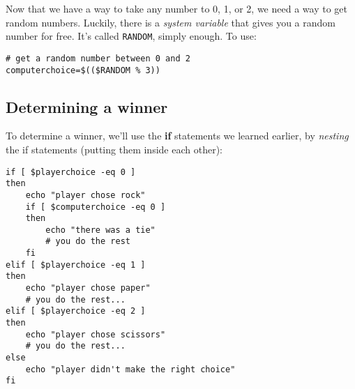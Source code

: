 \documentclass{article}
\begin{document}
Now that we have a way to take any number to 0, 1, or 2, we need a way to get
random numbers. Luckily, there is a \textit{system variable} that gives you a
random number for free. It's called \lstinline|RANDOM|, simply enough. To use:
\begin{lstlisting}
# get a random number between 0 and 2
computerchoice=$(($RANDOM % 3))
\end{lstlisting}

\subsection*{Determining a winner}
To determine a winner, we'll use the \textbf{if} statements we learned earlier,
by \textit{nesting} the if statements (putting them inside each other):

\begin{lstlisting}
if [ $playerchoice -eq 0 ]
then
    echo "player chose rock"
    if [ $computerchoice -eq 0 ]
    then
        echo "there was a tie"
        # you do the rest
    fi
elif [ $playerchoice -eq 1 ]
then
    echo "player chose paper"
    # you do the rest...
elif [ $playerchoice -eq 2 ]
then
    echo "player chose scissors"
    # you do the rest...
else
    echo "player didn't make the right choice"
fi
\end{lstlisting}
\end{document}
